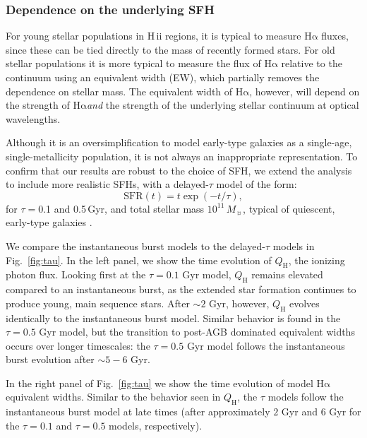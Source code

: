 \documentclass[preprint2]{aastex62}
\newcommand{\hii}{H\,{\sc ii}\xspace}
\newcommand\Msun{\ensuremath{\,M_{\sun}}\xspace}
\newcommand{\ha}{\ensuremath{\mathrm{H\alpha}}\xspace}
\newcommand{\QH}{\ensuremath{Q_{\mathrm{H}}}\xspace}
\newcommand{\Gyr}{$\,$Gyr\xspace}
\begin{document}
\subsubsection{Dependence on the underlying SFH} \label{sec:stars:emis:continuum}

For young stellar populations in \hii regions, it is typical to measure \ha fluxes, since these can be tied directly to the mass of recently formed stars. For old stellar populations it is more typical to measure the flux of \ha relative to the continuum using an equivalent width (EW), which partially removes the dependence on stellar mass. The equivalent width of \ha, however, will depend on the strength of \ha \emph{and} the strength of the underlying stellar continuum at optical wavelengths. %

Although it is an oversimplification to model early-type galaxies as a single-age, single-metallicity population, it is not always an inappropriate representation. To confirm that our results are robust to the choice of SFH, we extend the analysis to include more realistic SFHs, with a delayed-$\tau$ model of the form:
\begin{equation}
    \mathrm{SFR}(t) = t \exp (-t/\tau),
\end{equation}
for $\tau = $0.1 and 0.5\Gyr, and total stellar mass $10^{11}$\Msun, typical of quiescent, early-type galaxies \citep{Thomas+2005, Choi+2014}.

We compare the instantaneous burst models to the delayed-$\tau$ models in Fig.~\ref{fig:tau}. In the left panel, we show the time evolution of \QH, the ionizing photon flux. Looking first at the $\tau=0.1\,$\Gyr model, \QH remains elevated compared to an instantaneous burst, as the extended star formation continues to produce young, main sequence stars. After ${\sim}2\,$\Gyr, however, \QH evolves identically to the instantaneous burst model. Similar behavior is found in the $\tau=0.5\,$\Gyr model, but the transition to post-AGB dominated equivalent widths occurs over longer timescales: the $\tau=0.5\,$\Gyr model follows the instantaneous burst evolution after ${\sim}5-6\,$\Gyr. 

In the right panel of Fig.~\ref{fig:tau} we show the time evolution of model \ha equivalent widths. Similar to the behavior seen in \QH, the $\tau$ models follow the instantaneous burst model at late times (after approximately $2\,$\Gyr and $6\,$\Gyr for the $\tau=0.1$ and $\tau=0.5$ models, respectively). 
\end{document}

